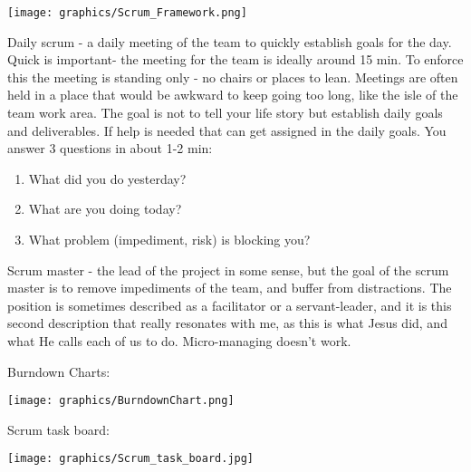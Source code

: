 \documentclass{article}
\begin{document}


\texttt{[image: graphics/Scrum\_Framework.png]}


Daily scrum - a daily meeting of the team to quickly establish goals for the day.  Quick is important- the meeting for the team is ideally around 15 min.  To enforce this the meeting is standing only - no chairs or places to lean.  Meetings are often held in a place that would be awkward to keep going too long, like the isle of the team work area.  The goal is not to tell your life story but establish daily goals and deliverables.  If help is needed that can get assigned in the daily goals.  You answer 3 questions in about 1-2 min:
\begin{enumerate}
\item What did you do yesterday?
\item What are you doing today?
\item What problem (impediment, risk) is blocking you?
\end{enumerate}

Scrum master - the lead of the project in some sense, but the goal of the scrum master is to remove impediments of the team, and buffer from distractions. The position is sometimes described as a facilitator or a servant-leader, and it is this second description that really resonates with me, as this is what Jesus did, and what He calls each of us to do.  Micro-managing doesn't work.

Burndown Charts:


\texttt{[image: graphics/BurndownChart.png]}

Scrum task board:


\texttt{[image: graphics/Scrum\_task\_board.jpg]}
\end{document}
